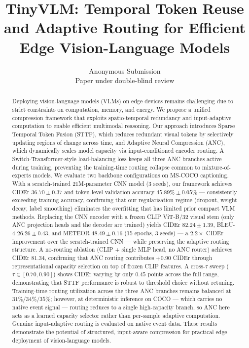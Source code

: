 \documentclass{article}
\title{TinyVLM: Temporal Token Reuse and Adaptive Routing for Efficient Edge Vision-Language Models}
\author{%
  Anonymous Submission \\
  Paper under double-blind review \\
}
\begin{document}
\maketitle


\begin{abstract}
Deploying vision-language models (VLMs) on edge devices remains challenging due to strict constraints on computation, memory, and energy. We propose a unified compression framework that exploits spatio-temporal redundancy and input-adaptive computation to enable efficient multimodal reasoning. Our approach introduces Sparse Temporal Token Fusion (STTF), which reduces redundant visual tokens by selectively updating regions of change across time, and Adaptive Neural Compression (ANC), which dynamically scales model capacity via input-conditioned encoder routing. A Switch-Transformer-style load-balancing loss keeps all three ANC branches active during training, preventing the training-time routing collapse common to mixture-of-experts models. We evaluate two backbone configurations on MS-COCO captioning. With a scratch-trained 21M-parameter CNN model (3 seeds), our framework achieves CIDEr $36.70 \pm 0.37$ and token-level validation accuracy $45.89\% \pm 0.05\%$ --- consistently exceeding training accuracy, confirming that our regularisation regime (dropout, weight decay, label smoothing) eliminates the overfitting that has limited prior compact VLM methods. Replacing the CNN encoder with a frozen CLIP ViT-B/32 visual stem (only ANC projection heads and the decoder are trained) yields CIDEr $82.24 \pm 1.39$, BLEU-4 $26.26 \pm 0.43$, and METEOR $48.49 \pm 0.16$ (15 epochs, 3 seeds) --- a $2.2\times$ CIDEr improvement over the scratch-trained CNN --- while preserving the adaptive routing structure. A no-routing ablation (CLIP + single MLP head, no ANC router) achieves CIDEr $81.34$, confirming that ANC routing contributes $+0.90$ CIDEr through representational capacity selection on top of frozen CLIP features. A cross-$\tau$ sweep ($\tau \in [0.70, 0.90]$) shows CIDEr varying by only $0.45$ points across the full range, demonstrating that STTF performance is robust to threshold choice without retuning. Training-time routing utilization across the three ANC branches remains balanced at $31\%$/$34\%$/$35\%$; however, at deterministic inference on COCO --- which carries no native event signal --- routing reduces to a single high-capacity branch, so ANC here acts as a learned capacity selector rather than per-sample adaptive computation. Genuine input-adaptive routing is evaluated on native event data. These results demonstrate the potential of structured, input-aware compression for practical edge deployment of vision-language models.
\end{abstract}
\end{document}
